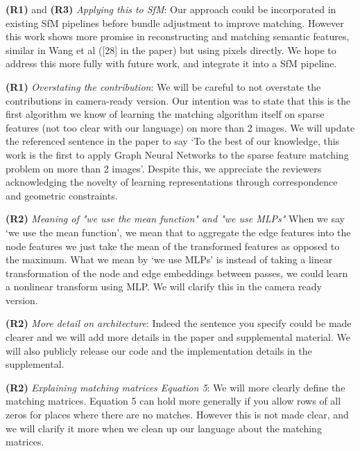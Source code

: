 \documentclass[10pt,twocolumn,letterpaper]{article}
\begin{document}
\textbf{(R1)} and \textbf{(R3)} \textit{Applying this to SfM}:
Our approach could be incorporated in existing SfM pipelines before bundle adjustment to improve matching.
However this work shows more promise in reconstructing and matching semantic features, similar in Wang et al ([28] in the paper) but using pixels directly.
We hope to address this more fully with future work, and integrate it into a SfM pipeline.

\textbf{(R1)} \textit{Overstating the contribution}:
We will be careful to not overstate the contributions in camera-ready version.
Our intention was to state that this is the first algorithm we know of learning the matching algorithm itself on sparse features (not too clear with our language) on more than 2 images.
We will update the referenced sentence in the paper to say `To the best of our knowledge, this work is the first to apply Graph Neural Networks to the sparse feature matching problem on more than 2 images'.
Despite this, we appreciate the reviewers acknowledging the novelty of learning representations through correspondence and geometric constraints.

\textbf{(R2)} \textit{Meaning of "we use the mean function" and "we use MLPs"}
When we say `we use the mean function', we mean that to aggregate the edge features into the node features we just take the mean of the transformed features as opposed to the maximum.
What we mean by `we use MLPs' is instead of taking a linear transformation of the node and edge embeddings between passes, we could learn a nonlinear transform using MLP.
We will clarify this in the camera ready version.

\textbf{(R2)} \textit{More detail on architecture}:
Indeed the sentence you specify could be made clearer and we will add more details in the paper and supplemental material.
We will also publicly release our code and the implementation details in the supplemental.

\textbf{(R2)} \textit{Explaining matching matrices Equation 5}:
We will more clearly define the matching matrices.
Equation 5 can hold more generally if you allow rows of all zeros for places where there are no matches.
However this is not made clear, and we will clarify it more when we clean up our language about the matching matrices.
\end{document}
